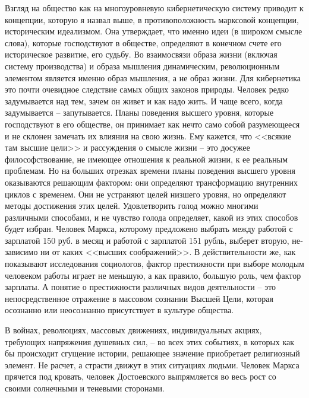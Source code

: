 \documentclass{book}
\begin{document}
Взгляд на общество как на многоуровневую кибернетиче­скую систему приводит к концепции, которую я назвал выше, в противоположность марксовой концепции, историческим идеализмом.  Она утверждает, что именно идеи  (в широком смысле слова), которые господствуют в обществе, определяют в конечном счете его историческое развитие, его судьбу. Во взаимосвязи образа жизни (включая систему производства) и образа мышления динамическим, революционным элемен­том является именно образ мышления, а не образ жизни. Для кибернетика это почти очевидное следствие самых общих зако­нов природы. Человек редко задумывается над тем, зачем он живет и как надо жить. И чаще всего, когда задумывается -- запутывается. Планы поведения высшего уровня, которые господствуют в его обществе, он принимает как нечто само собой разумеющееся и не склонен замечать их влияния на свою жизнь. Ему кажется, что <<всякие там высшие цели>> и рассуж­дения о смысле жизни -- это досужее философствование, не имеющее отношения к реальной жизни, к ее реальным пробле­мам. Но на больших отрезках времени планы поведения выс­шего уровня оказываются решающим фактором: они опреде­ляют трансформацию внутренних циклов с временем. Они не устраняют целей низшего уровня, но определяют методы до­стижения этих целей. Удовлетворить голод можно многими различными способами, и не  чувство голода определяет, ка­кой из этих способов будет избран. Человек Маркса, которо­му предложено выбрать между работой с зарплатой 150 руб. в месяц и работой с зарплатой 151 рубль, выберет вторую, не­зависимо ни от каких <<высших соображений>>. В действительности же, как показывают исследования социологов, фактор престижности при выборе молодым человеком работы играет не меньшую, а как правило, большую роль, чем фактор зарплаты. А понятие о престижности различных видов деятель­ности -- это непосредственное отражение в массовом сознании Высшей Цели, которая осознанно или неосознанно присутствует в культуре общества.

В войнах, революциях, массовых движениях, индивидуаль­ных акциях, требующих напряжения душевных сил, -- во всех этих событиях, в которых как бы происходит сгущение истории, решающее значение приобретает религиозный элемент. Не расчет, а страсти движут в этих ситуациях людьми. Человек Маркса прячется под кровать, человек Достоевского выпрямляется во весь рост со своими солнечными и теневыми сторонами.
\end{document}
